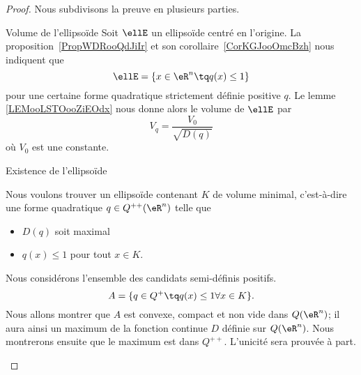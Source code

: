 \begin{proof}
    Nous subdivisons la preuve en plusieurs parties.
    \begin{subproof}
        \item[Volume de l'ellipsoïde]
            Soit \( \ellE\) un ellipsoïde centré en l'origine. La proposition~\ref{PropWDRooQdJiIr} et son corollaire~\ref{CorKGJooOmcBzh} nous indiquent que
            \begin{equation}
                \ellE=\{ x\in \eR^n\tq q(x)\leq 1 \}
            \end{equation}
            pour une certaine forme quadratique strictement définie positive \( q\). Le lemme \ref{LEMooLSTOooZiEOdx} nous donne alors le volume de \( \ellE\) par
            \begin{equation}
                V_q=\frac{ V_0 }{ \sqrt{ D(q) } }
            \end{equation}
            où \( V_0\) est une constante.
        \item[Existence de l'ellipsoïde]

            Nous voulons trouver un ellipsoïde contenant \( K\) de volume minimal, c'est-à-dire une forme quadratique \( q\in Q^{++}(\eR^n)\) telle que
            \begin{itemize}
                \item \( D(q)\) soit maximal
                \item \( q(x)\leq 1\) pour tout \( x\in K\).
            \end{itemize}
            Nous considérons l'ensemble des candidats semi-définis positifs.
            \begin{equation}
                A=\{ q\in Q^+\tq q(x)\leq 1\forall x\in K \}.
            \end{equation}
            Nous allons montrer que \( A\) est convexe, compact et non vide dans \( Q(\eR^n)\); il aura ainsi un maximum de la fonction continue \( D\) définie sur \( Q(\eR^n)\). Nous montrerons ensuite que le maximum est dans \( Q^{++}\). L'unicité sera prouvée à part.


\end{subproof}
\end{proof}
